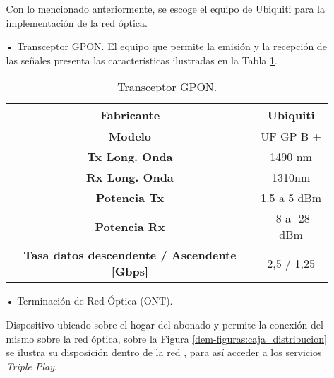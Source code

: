 \begin{enumerate}
\begin{enumerate}
Con lo mencionado anteriormente, se escoge el equipo de Ubiquiti para la implementación de la red  óptica.





\item[•]Transceptor GPON.
El equipo que permite la emisión y la recepción de las señales presenta las características ilustradas en la Tabla \ref{tab:transceptor-GPON}.

\begin{table}[H]
  \centering
    \begin{tabular}{|c|c|}
    \hline
    \rowcolor[rgb]{ .773,  .851,  .945} \textbf{Fabricante} & \cellcolor[rgb]{ 1,  1,  1}Ubiquiti \bigstrut\\
    \hline
    \rowcolor[rgb]{ .773,  .851,  .945} \textbf{Modelo} & \cellcolor[rgb]{ 1,  1,  1}UF-GP-B + \bigstrut\\
    \hline
    \rowcolor[rgb]{ .773,  .851,  .945} \textbf{Tx Long. Onda} & \cellcolor[rgb]{ 1,  1,  1}1490 nm \bigstrut\\
    \hline
    \rowcolor[rgb]{ .773,  .851,  .945} \textbf{Rx Long. Onda} & \cellcolor[rgb]{ 1,  1,  1}1310nm \bigstrut\\
    \hline
    \rowcolor[rgb]{ .773,  .851,  .945} \textbf{Potencia Tx} & \cellcolor[rgb]{ 1,  1,  1}1.5 a 5 dBm \bigstrut\\
    \hline
    \rowcolor[rgb]{ .773,  .851,  .945} \textbf{Potencia Rx} & \cellcolor[rgb]{ 1,  1,  1}-8 a -28 dBm \bigstrut\\
    \hline
    \rowcolor[rgb]{ .773,  .851,  .945} \textbf{Tasa datos descendente / Ascendente [Gbps]} & \cellcolor[rgb]{ 1,  1,  1}2,5 / 1,25 \bigstrut\\
    \hline
    \end{tabular}%
    \caption{Transceptor GPON.}
  \label{tab:transceptor-GPON}%
\end{table}%




\item[•]Terminación de Red Óptica (ONT).

Dispositivo ubicado sobre el hogar del abonado y permite la conexión del mismo sobre la red óptica, sobre la Figura \ref{dem-figuras:caja_distribucion} se ilustra su disposición dentro de la red , para así acceder a los servicios \textit{Triple Play}.


\end{enumerate}
\end{enumerate}
